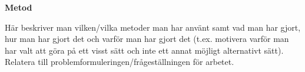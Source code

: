 \begin{mdframed}[innertopmargin=10pt, innerbottommargin=10pt, innerleftmargin=10pt, innerrightmargin=10pt, skipabove=10pt, skipbelow=10pt, roundcorner=10pt]
    \textbf{Metod}
    
    Här beskriver man vilken/vilka metoder man har använt samt vad man har gjort, hur man har gjort det och varför man har gjort det (t.ex. motivera varför man har valt att göra på ett visst sätt och inte ett annat möjligt alternativt sätt). Relatera till problemformuleringen/frågeställningen för arbetet.
    \end{mdframed}
